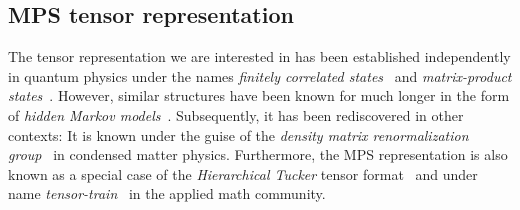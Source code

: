 


\subsection{MPS tensor representation}%
\label{sub:mps.tensor_representation}

The tensor representation we are interested in has been established independently in quantum physics under the names \emph{finitely correlated states}~\cite{Fannes_1992_Finitely} and \emph{matrix-product states}~\cite{Klumper_1991_Equivalence,Kluemper_1992_Groundstate}.
However, similar structures have been known for much longer in the form of  \emph{hidden Markov models}~\cite{Cappe_2006_Inference}.
Subsequently, it has been rediscovered in other contexts:
It is known under the guise of the \emph{density matrix renormalization group}~\cite{White_1992_Density,Schollwoeck_2011_DensityMatrix} in condensed matter physics.
Furthermore, the MPS representation is also known as a special case of the \emph{Hierarchical Tucker} tensor format~\cite{Hackbusch_2012_Tensor,Grasedyck_2010_Hierarchical} and under name \emph{tensor-train}~\cite{Oseledets_2011_TensorTrain} in the applied math community.

